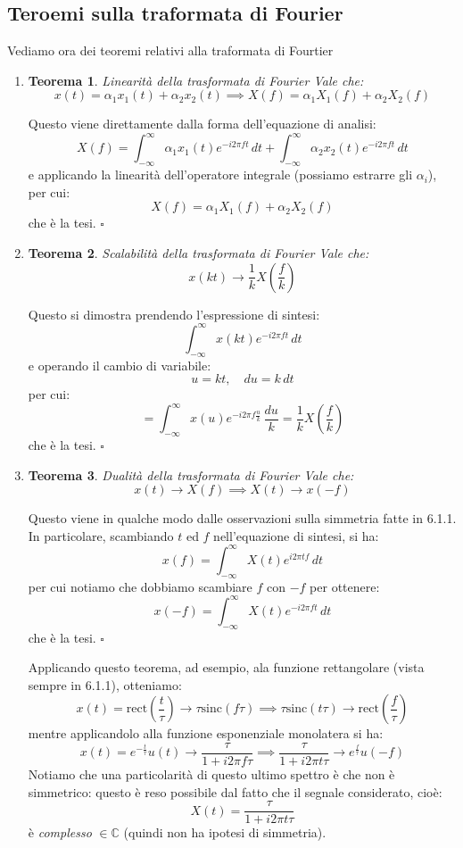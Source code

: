 \documentclass[11pt,a4paper]{article}
\newtheorem{theorem}{Teorema}[section]
\begin{document}
\subsection{Teroemi sulla traformata di Fourier}
Vediamo ora dei teoremi relativi alla traformata di Fourtier
\begin{enumerate}
\item \begin{theorem}{Linearità della trasformata di Fourier}
Vale che:
$$
x(t) = \alpha_1 x_1(t) + \alpha_2 x_2(t) \implies X(f) = \alpha_1 X_1(f) + \alpha_2 X_2(f)
$$
\end{theorem}
Questo viene direttamente dalla forma dell'equazione di analisi:
$$
X(f) = \int_{-\infty}^{\infty} \alpha_1 x_1(t) e^{-i 2 \pi  f t} \, dt + \int_{-\infty}^{\infty} \alpha_2 x_2(t) e^{-i 2 \pi  f t} \, dt
$$
e applicando la linearità dell'operatore integrale (possiamo estrarre gli $\alpha_i$), per cui:
$$
X(f) = \alpha_1 X_1(f) + \alpha_2 X_2(f)
$$
che è la tesi. \hfill $\square$

\item \begin{theorem}{Scalabilità della trasformata di Fourier}
Vale che:
$$
x(kt) \rightarrow \frac{1}{k} X\left(\frac{f}{k}\right) 
$$
\end{theorem}
Questo si dimostra prendendo l'espressione di sintesi:
$$
\int_{-\infty}^{\infty} x(kt) e^{-i 2 \pi f t} \, dt
$$
e operando il cambio di variabile:
$$
u = kt, \quad du = k \, dt
$$
per cui:
$$
= \int_{-\infty}^{\infty} x(u) e^{-i 2 \pi f \frac{u}{k}} \, \frac{du}{k} = \frac{1}{k} X\left(\frac{f}{k}\right)
$$
che è la tesi. \hfill $\square$

\item \begin{theorem}{Dualità della trasformata di Fourier}
Vale che:
$$
x(t) \rightarrow X(f) \implies X(t) \rightarrow x(-f)
$$
\end{theorem}
Questo viene in qualche modo dalle osservazioni sulla simmetria fatte in 6.1.1. In particolare, scambiando $t$ ed $f$ nell'equazione di sintesi, si ha:
$$
x(f) = \int_{-\infty}^{\infty} X(t) e^{i 2 \pi t f} \, dt
$$
per cui notiamo che dobbiamo scambiare $f$ con $-f$ per ottenere:
$$
x(-f) = \int_{-\infty}^{\infty} X(t) e^{-i 2 \pi f t} \, dt
$$
che è la tesi. \hfill $\square$

Applicando questo teorema, ad esempio, ala funzione rettangolare (vista sempre in 6.1.1), otteniamo:
$$
x(t) = \mathrm{rect} \left( \frac{t}{\tau} \right) \rightarrow \tau \mathrm{sinc} (f \tau) \implies \tau \mathrm{sinc} (t \tau) \rightarrow \mathrm{rect} \left(\frac{f}{\tau}\right) 
$$
mentre applicandolo alla funzione esponenziale monolatera si ha:
$$
x(t) = e^{-\frac{t}{\tau}} u(t) \rightarrow \frac{\tau}{1 + i 2 \pi f \tau} \implies \frac{\tau}{1 + i 2 \pi t \tau} \rightarrow e^{\frac{f}{\tau}} u(-f)
$$
Notiamo che una particolarità di questo ultimo spettro è che non è simmetrico: questo è reso possibile dal fatto che il segnale considerato, cioè:
$$
X(t) = \frac{\tau}{1 + i 2 \pi t \tau}
$$
è \textit{complesso} $\in \mathbb{C}$ (quindi non ha ipotesi di simmetria).


\end{enumerate}
\end{document}
